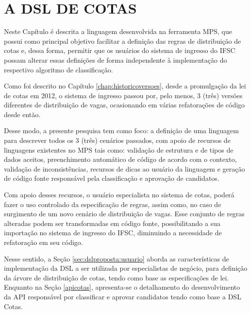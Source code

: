 \chapter{A DSL DE COTAS}
\label{chap:dslcotas}

   Neste Capítulo é descrita a linguagem desenvolvida na ferramenta \gls{MPS}, que possui como principal objetivo facilitar a definição das regras de distribuição de cotas e, dessa forma, permitir que os usuários do sistema de ingresso do \gls{IFSC} possam alterar essas definições de forma independente à implementação do respectivo algoritmo de classificação.
   
   Como foi descrito no Capítulo \ref{chap:historicoversoes}, desde a promulgação da lei de cotas em 2012, o sistema de ingresso passou por, pelo menos, 3 (três) versões diferentes de distribuição de vagas, ocasionando em várias refatorações de código desde então. 
   
   Desse modo, a presente pesquisa tem como foco: a definição de uma linguagem para descrever todos os 3 (três) cenários passados, com apoio de recursos de linguagens existentes no \gls{MPS} tais como: validação de estrutura e de tipos de dados aceitos, preenchimento automático de código de acordo com o contexto, validação de inconsistências, recursos de dicas ao usuário da linguagem e geração de código fonte responsável pela classificação e aprovação de candidatos. 
   
   Com apoio desses recursos, o usuário especialista no sistema de cotas, poderá fazer o uso controlado da especificação de regras, assim como, no caso de surgimento de um novo cenário de distribuição de vagas. Esse conjunto de regras alteradas podem ser transformadas em código fonte, possibilitando a  sua importação no sistema de ingresso do \gls{IFSC}, diminuindo a necessidade de refatoração em seu código.
   
   Nesse sentido, a Seção \ref{sec:dslproposta:usuario} aborda as características de implementação da \gls{DSL} a ser utilizada por especialistas de negócio, para definição da árvore de distribuição de cotas, tendo como base as especificações de lei. Enquanto na Seção \ref{apicotas}, apresenta-se o detalhamento do desenvolvimento da \gls{API} responsável por classificar e aprovar candidatos tendo como base a DSL Cotas.
   
  
   

  
 

